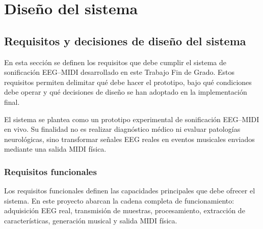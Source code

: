 \documentclass[../main.tex]{subfiles}
\begin{document}
\section{Diseño del sistema}

\subsection{Requisitos y decisiones de diseño del sistema}

En esta sección se definen los requisitos que debe cumplir el sistema de sonificación EEG--MIDI desarrollado en este Trabajo Fin de Grado. Estos requisitos permiten delimitar qué debe hacer el prototipo, bajo qué condiciones debe operar y qué decisiones de diseño se han adoptado en la implementación final.

El sistema se plantea como un prototipo experimental de sonificación EEG--MIDI en vivo. Su finalidad no es realizar diagnóstico médico ni evaluar patologías neurológicas, sino transformar señales EEG reales en eventos musicales enviados mediante una salida MIDI física.

\subsubsection{Requisitos funcionales}

Los requisitos funcionales definen las capacidades principales que debe ofrecer el sistema. En este proyecto abarcan la cadena completa de funcionamiento: adquisición EEG real, transmisión de muestras, procesamiento, extracción de características, generación musical y salida MIDI física.
\end{document}

